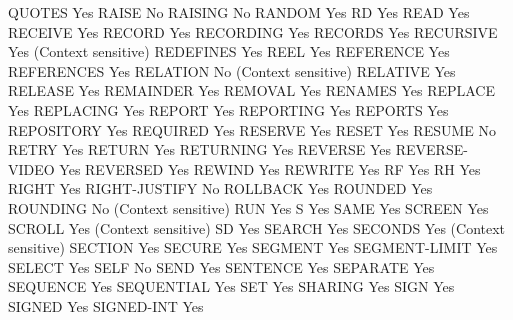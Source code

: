 QUOTES                          Yes
RAISE                           No
RAISING                         No
RANDOM                          Yes
RD                              Yes
READ                            Yes
RECEIVE                         Yes
RECORD                          Yes
RECORDING                       Yes
RECORDS                         Yes
RECURSIVE                       Yes (Context sensitive)
REDEFINES                       Yes
REEL                            Yes
REFERENCE                       Yes
REFERENCES                      Yes
RELATION                        No (Context sensitive)
RELATIVE                        Yes
RELEASE                         Yes
REMAINDER                       Yes
REMOVAL                         Yes
RENAMES                         Yes
REPLACE                         Yes
REPLACING                       Yes
REPORT                          Yes
REPORTING                       Yes
REPORTS                         Yes
REPOSITORY                      Yes
REQUIRED                        Yes
RESERVE                         Yes
RESET                           Yes
RESUME                          No
RETRY                           Yes
RETURN                          Yes
RETURNING                       Yes
REVERSE                         Yes
REVERSE-VIDEO                   Yes
REVERSED                        Yes
REWIND                          Yes
REWRITE                         Yes
RF                              Yes
RH                              Yes
RIGHT                           Yes
RIGHT-JUSTIFY                   No
ROLLBACK                        Yes
ROUNDED                         Yes
ROUNDING                        No (Context sensitive)
RUN                             Yes
S                               Yes
SAME                            Yes
SCREEN                          Yes
SCROLL                          Yes (Context sensitive)
SD                              Yes
SEARCH                          Yes
SECONDS                         Yes (Context sensitive)
SECTION                         Yes
SECURE                          Yes
SEGMENT                         Yes
SEGMENT-LIMIT                   Yes
SELECT                          Yes
SELF                            No
SEND                            Yes
SENTENCE                        Yes
SEPARATE                        Yes
SEQUENCE                        Yes
SEQUENTIAL                      Yes
SET                             Yes
SHARING                         Yes
SIGN                            Yes
SIGNED                          Yes
SIGNED-INT                      Yes
